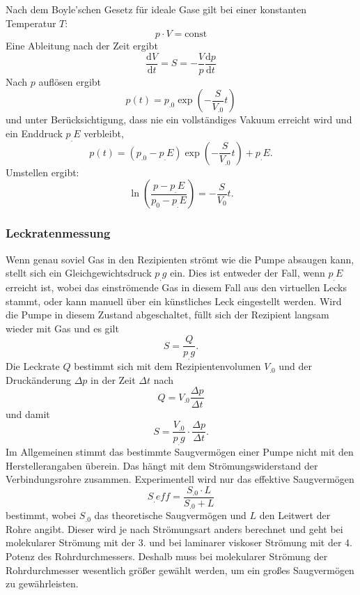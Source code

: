 Nach dem Boyle'schen Gesetz für ideale Gase gilt bei einer konstanten Temperatur $T$:
\begin{equation}
p\cdot V =\text{const}\label{eq:Boyle}
\end{equation}
Eine Ableitung nach der Zeit ergibt
\[
\frac{\mathrm{d}V}{\mathrm{d}t} = S = - \frac{V}{p} \frac{\mathrm{d}p}{\mathrm{d}t}
\]
Nach $p$ auflösen ergibt
\begin{equation}
p(t)=p_.0\exp{\left(-\frac{S}{V_.0}t\right)}\label{eq:pt1}
\end{equation}
und unter  Berücksichtigung, dass nie ein vollständiges Vakuum erreicht wird und ein Enddruck $p_.E$ verbleibt,
\begin{equation}
p(t)=(p_.0-p_.E)\exp{\left(-\frac{S}{V_.0}t\right)}+p_.E\text{.}\label{eq:pt2}
\end{equation}
Umstellen ergibt:
\begin{equation}
\ln\left(\frac{p-p_.E}{p_0-p_.E}\right) = -\frac{S}{V_0}t\text{.}\label{eq:S2}
\end{equation}

\subsubsection{Leckratenmessung}

Wenn genau soviel Gas in den Rezipienten strömt wie die Pumpe absaugen kann, stellt sich ein Gleichgewichtsdruck $p_.g$ ein. Dies ist entweder der Fall, wenn $p_.E$ erreicht ist, wobei das einströmende Gas in diesem Fall aus den virtuellen Lecks stammt, oder kann manuell über ein künstliches Leck eingestellt werden. \newline 
Wird die Pumpe in diesem Zustand abgeschaltet, füllt sich der Rezipient langsam wieder mit Gas und es gilt 
\[
S=\frac{Q}{p_.g}\text{.}
\]
Die Leckrate $Q$ bestimmt sich mit dem Rezipientenvolumen $V_.0$ und der Druckänderung $\Delta p$ in der Zeit $\Delta t$ nach
\[
Q=V_.0\frac{\Delta p}{\Delta t}
\]
und damit
\begin{equation}
S=\frac{V_.0}{p_.g}\cdot\frac{\Delta p}{\Delta t}\text{.}\label{eq:S}
\end{equation}
\newline\newline
Im Allgemeinen stimmt das bestimmte Saugvermögen einer Pumpe nicht mit den Herstellerangaben überein.
Das hängt mit dem Strömungswiderstand der Verbindungsrohre zusammen.
Experimentell wird nur das effektive Saugvermögen
\begin{equation}
S_.{eff}=\frac{S_.0\cdot L}{S_.0+L}
\end{equation}
bestimmt, wobei $S_.0$ das theoretische Saugvermögen und $L$ den Leitwert der Rohre angibt.
Dieser wird je nach Strömungsart anders berechnet und geht bei molekularer Strömung mit der 3. und bei laminarer viskoser Strömung mit der 4. Potenz des Rohrdurchmessers.
Deshalb muss bei molekularer Strömung der Rohrdurchmesser wesentlich größer gewählt werden, um ein großes Saugvermögen zu gewährleisten.

